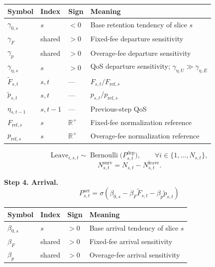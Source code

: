 \documentclass[11pt]{article}
\begin{document}
\begin{longtable}{@{}llll@{}}
\toprule
Symbol & Index & Sign & Meaning \\
\midrule
\endhead
$\gamma_{0,s}$ & $s$ & $< 0$ & Base retention tendency of slice $s$ \\
$\gamma_F$ & shared & $> 0$ & Fixed-fee departure sensitivity \\
$\gamma_p$ & shared & $> 0$ & Overage-fee departure sensitivity \\
$\gamma_{\eta,s}$ & $s$ & $> 0$ & QoS departure sensitivity; $\gamma_{\eta,U} \gg \gamma_{\eta,E}$ \\
$\tilde{F}_{s,t}$ & $s,t$ & --- & $F_{s,t}/F_{\mathrm{ref},s}$ \\
$\tilde{p}_{s,t}$ & $s,t$ & --- & $p_{s,t}/p_{\mathrm{ref},s}$ \\
$\eta_{s,t-1}$ & $s,t-1$ & --- & Previous-step QoS \\
$F_{\mathrm{ref},s}$ & $s$ & $\mathbb{R}^{+}$ & Fixed-fee normalization reference \\
$p_{\mathrm{ref},s}$ & $s$ & $\mathbb{R}^{+}$ & Overage-fee normalization reference \\
\bottomrule
\end{longtable}

\begin{equation*}
\mathrm{Leave}_{i,s,t} \sim \operatorname{Bernoulli}\bigl(P_{s,t}^{\mathrm{dep}}\bigr),
\qquad \forall i \in \{1,\ldots,N_{s,t}\},
\end{equation*}
\begin{equation*}
N_{s,t}^{\mathrm{surv}} = N_{s,t} - N_{s,t}^{\mathrm{leave}}.
\end{equation*}

\textbf{Step 4. Arrival.}
\begin{equation}
P_{s,t}^{\mathrm{arr}} = \sigma\!\left(\beta_{0,s} - \beta_F \tilde{F}_{s,t} - \beta_p \tilde{p}_{s,t}\right)
\tag{F4}
\end{equation}

\begin{longtable}{@{}llll@{}}
\toprule
Symbol & Index & Sign & Meaning \\
\midrule
\endhead
$\beta_{0,s}$ & $s$ & $> 0$ & Base arrival tendency of slice $s$ \\
$\beta_F$ & shared & $> 0$ & Fixed-fee arrival sensitivity \\
$\beta_p$ & shared & $> 0$ & Overage-fee arrival sensitivity \\
\bottomrule
\end{longtable}
\end{document}
